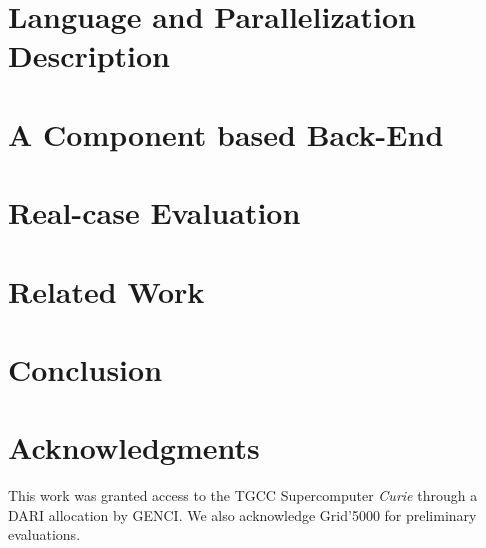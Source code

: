 \documentclass{acm_proc_article-sp}
\begin{document}
\section{Language and Parallelization Description}
\label{sect:msmsc}

\section{A Component based Back-End}
\label{sect:component}

\section{Real-case Evaluation}
\label{sect:eval}

\section{Related Work}
\label{sect:related}

\section{Conclusion}
\label{sect:conclusion}


\section{Acknowledgments}

This work was granted access to the TGCC Supercomputer \textit{Curie} through a DARI allocation by GENCI.
We also acknowledge Grid'5000 for preliminary evaluations.

\small

  
\end{document}
